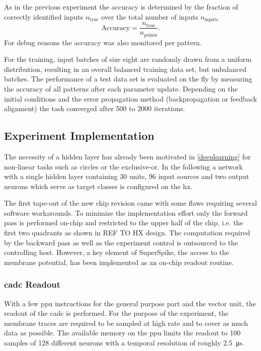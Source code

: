 As in the previous experiment the accuracy is determined by the fraction of correctly identified inputs $n_\text{true}$ over the total number of inputs $n_\text{inputs}$
\begin{equation}
\text{Accuracy} = \frac{n_\text{true}}{n_\text{points}}.
\end{equation}
For debug reasons the accuracy was also monitored per pattern.

For the training, input batches of size eight are randomly drawn from a uniform distribution, resulting in an overall balanced training data set, but unbalanced batches. The performance of a test data set is evaluated on the fly by measuring the accuracy of all patterns after each parameter update. Depending on the initial conditions and the error propagation method (backpropagation or feedback alignment) the task converged after 500 to 2000 iterations.

\subsection{Experiment Implementation}
The necessity of a hidden layer has already been motivated in \cref{deeplearning} for non-linear tasks such as circles or the exclusive-or. In the following a network with a single hidden layer containing 30 units, 96 input sources and two output neurons which serve as target classes is configured on the \gls{hx}. 

The first tape-out of the new chip revision came with some flaws requiring several software workarounds. To minimize the implementation effort only the forward pass is performed on-chip and restricted to the upper half of the chip, i.e. the first two quadrants as shown in REF TO HX design. The computation required by the backward pass as well as the experiment control is outsourced to the controlling host. However, a key element of SuperSpike, the access to the membrane potential, has been implemented as an on-chip readout routine.

\subsubsection*{\gls{cadc} Readout}
With a few \gls{ppu} instructions for the general purpose part and the vector unit, the readout of the \gls{cadc} is performed. For the purpose of the experiment, the membrane traces are required to be sampled at high rate and to cover as much data as possible. The available memory on the \gls{ppu} limits the readout to 100 samples of 128 different neurons with a temporal resolution of roughly \SI{2.5}{\micro \s}. 

